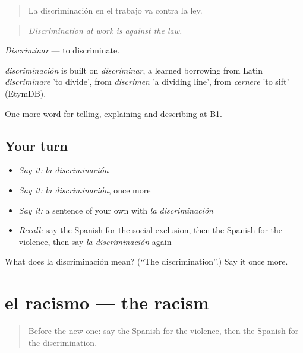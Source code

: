 \begin{quote}
La discriminación en el trabajo va contra la ley.
\end{quote}

\begin{quote}
\emph{Discrimination at work is against the law.}
\end{quote}

\emph{Discriminar} — to discriminate.

\begin{cousinweb}
\emph{discriminación} is built on \emph{discriminar}, a learned borrowing from Latin \emph{discriminare} 'to divide', from \emph{discrimen} 'a dividing line', from \emph{cernere} 'to sift' (EtymDB).
\end{cousinweb}

\begin{grammarlens}[title={What you've built}]
One more word for telling, explaining and describing at B1.
\end{grammarlens}

\subsection*{Your turn}
\begin{itemize}
\raggedright
  \item \emph{Say it:} \emph{la discriminación}
  \item \emph{Say it:} \emph{la discriminación}, once more
  \item \emph{Say it:} a sentence of your own with \emph{la discriminación}
  \item \emph{Recall:} say the Spanish for the social exclusion, then the Spanish for the violence, then say \emph{la discriminación} again
\end{itemize}

\begin{tcolorbox}[breakable,colback=teal!4,colframe=teal!35!black,title={Before you move on}]
What does la discriminación mean? (\textquotedblleft{}The discrimination\textquotedblright{}.) Say it once more.
\end{tcolorbox}
\section[el racismo]{el racismo — the racism}

\label{lesson:ES-C605-racismo}



\begin{quote}
Before the new one: say the Spanish for the violence, then the Spanish for the discrimination.
\end{quote}

